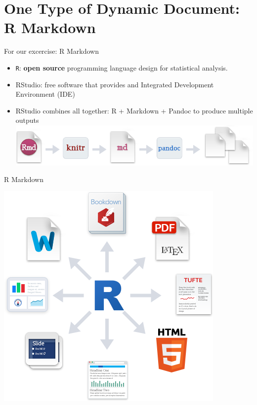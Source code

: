\documentclass[ignorenonframetext,]{beamer}
\providecommand{\tightlist}{%
  \setlength{\itemsep}{0pt}\setlength{\parskip}{0pt}}
\begin{document}
\section{One Type of Dynamic Document: R
Markdown}\label{one-type-of-dynamic-document-r-markdown}

\begin{frame}[fragile]{For our excercise: R Markdown}

\begin{itemize}
\tightlist
\item
  \texttt{R}: \textbf{open source} programming language design for
  statistical analysis.\\
\item
  RStudio: free software that provides and Integrated Development
  Environment (IDE)\\
\item
  RStudio combines all together: R + Markdown + Pandoc to produce
  multiple outputs \includegraphics{../Images/RMarkdownFlow.png}
\end{itemize}

\end{frame}

\begin{frame}{R Markdown}

\includegraphics{../Images/RMarkdownOutputFormats.png}

\end{frame}
\end{document}
